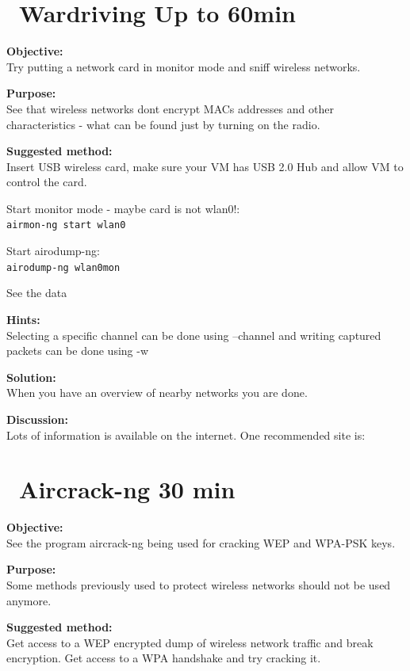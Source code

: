 \documentclass[a4paper,11pt,notitlepage]{report}
\begin{document}
\chapter{\faInfoCircle\ Wardriving Up to 60min}
\label{ex:wardriving}

{\bf Objective:}\\
Try putting a network card in monitor mode and sniff wireless networks.

{\bf Purpose:}\\
See that wireless networks dont encrypt MACs addresses and other characteristics - what can be found just by turning on the radio.

{\bf Suggested method:}\\
Insert USB wireless card, make sure your VM has USB 2.0 Hub and allow VM to control the card.

Start monitor mode - maybe card is not wlan0!:\\
\verb+airmon-ng start wlan0+

Start airodump-ng:\\
\verb+airodump-ng wlan0mon+

See the data

{\bf Hints:}\\
Selecting a specific channel can be done using --channel and writing captured packets can be done using -w

{\bf Solution:}\\
When you have an overview of nearby networks you are done.

{\bf Discussion:}\\

Lots of information is available on the internet. One recommended site is:\\


\chapter{\faExclamationTriangle\ Aircrack-ng 30 min}
\label{ex:aircrack-ng}

{\bf Objective:}\\
See the program aircrack-ng being used for cracking WEP and WPA-PSK keys.

{\bf Purpose:}\\
Some methods previously used to protect wireless networks should not be used anymore.

{\bf Suggested method:}\\
Get access to a WEP encrypted dump of wireless network traffic and break encryption. Get access to a WPA handshake and try cracking it.
\end{document}
